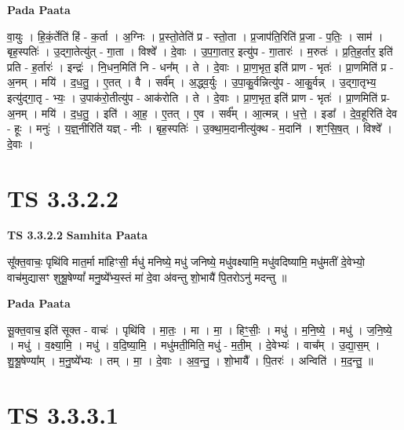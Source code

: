 \documentclass[17pt]{extarticle}
\begin{document}
\textbf{Pada Paata} \newline

वा॒युः । हि॒कं॒र्तेति॑ हिं - क॒र्ता । अ॒ग्निः । प्र॒स्तो॒तेति॑ प्र - स्तो॒ता । प्र॒जाप॑ति॒रिति॑ प्र॒जा - प॒तिः॒ । साम॑ । बृह॒स्पतिः॑ । उ॒द्गा॒तेत्यु॑त् - गा॒ता । विश्वे᳚ । दे॒वाः । उ॒प॒गा॒तार॒ इत्यु॑प - गा॒तारः॑ । म॒रुतः॑ । प्र॒ति॒ह॒र्तार॒ इति॑ प्रति - ह॒र्तारः॑ । इन्द्रः॑ । नि॒धन॒मिति॑ नि - धन᳚म् । ते । दे॒वाः । प्रा॒ण॒भृत॒ इति॑ प्राण - भृतः॑ । प्रा॒णमिति॑ प्र - अ॒नम् । मयि॑ । द॒ध॒तु॒ । ए॒तत् । वै । सर्व᳚म् । अ॒द्ध्व॒र्युः । उ॒पा॒कु॒र्वन्नित्यु॑प - आ॒कु॒र्वन्न् । उ॒द्गा॒तृभ्य॒ इत्यु॑द्गा॒तृ - भ्यः॒ । उ॒पाक॑रो॒तीत्यु॑प - आक॑रोति । ते । दे॒वाः । प्रा॒ण॒भृत॒ इति॑ प्राण - भृतः॑ । प्रा॒णमिति॑ प्र-अ॒नम् । मयि॑ । द॒ध॒तु॒ । इति॑ । आ॒ह॒ । ए॒तत् । ए॒व । सर्व᳚म् । आ॒त्मन्न् । ध॒त्ते॒ । इडा᳚ । दे॒व॒हूरिति॑ देव - हूः । मनुः॑ । य॒ज्ञ्॒नीरिति॑ यज्ञ् - नीः । बृह॒स्पतिः॑ । उ॒क्था॒म॒दानीत्यु॑क्थ - म॒दानि॑ । शꣳ॒॒सि॒ष॒त् । विश्वे᳚ । दे॒वाः ।  \newline




\section*{ TS 3.3.2.2 }

\textbf{TS 3.3.2.2 } \newline
\textbf{Samhita Paata} \newline

सू᳚क्त॒वाचः॒ पृथि॑वि मात॒र्मा मा॑हिꣳसी॒ र्मधु॑ मनिष्ये॒ मधु॑ जनिष्ये॒ मधु॑वक्ष्यामि॒ मधु॑वदिष्यामि॒ मधु॑मतीं दे॒वेभ्यो॒ वाच॑मुद्यासꣳ शुश्रू॒षेण्यां᳚ मनु॒ष्ये᳚भ्य॒स्तं मा॑ दे॒वा अ॑वन्तु शो॒भायै॑ पि॒तरोऽनु॑ मदन्तु ॥ \newline

\textbf{Pada Paata} \newline

सू॒क्त॒वाच॒ इति॑ सूक्त - वाचः॑ । पृथि॑वि । मा॒तः॒ । मा । मा॒ । हिꣳ॒॒सीः॒ । मधु॑ । म॒नि॒ष्ये॒ । मधु॑ । ज॒नि॒ष्ये॒ । मधु॑ । व॒क्ष्या॒मि॒ । मधु॑ । व॒दि॒ष्या॒मि॒ । मधु॑मती॒मिति॒ मधु॑ - म॒ती॒म् । दे॒वेभ्यः॑ । वाच᳚म् । उ॒द्या॒स॒म् । शु॒श्रू॒षेण्या᳚म् । म॒नु॒ष्ये᳚भ्यः । तम् । मा॒ । दे॒वाः । अ॒व॒न्तु॒ । शो॒भायै᳚ । पि॒तरः॑ । अन्विति॑ । म॒द॒न्तु॒ ॥  \newline




\section*{ TS 3.3.3.1 }
\end{document}
